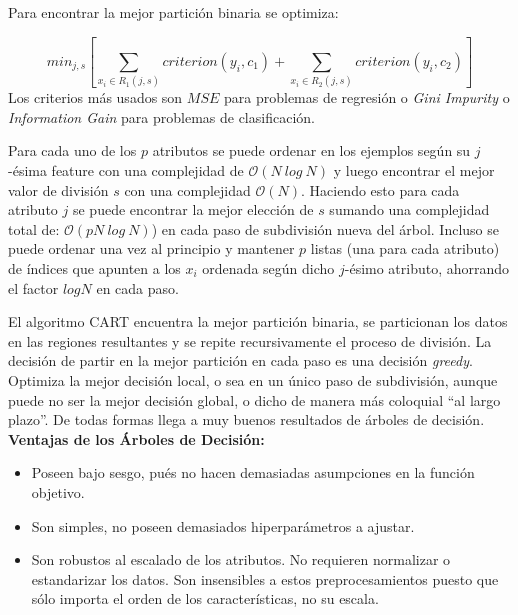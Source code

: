 Para encontrar la mejor partición binaria se optimiza:

\begin{equation*}
    min_{j,s} [ \sum_{x_i \in R_1(j,s)} criterion(y_i, c_1) + \sum_{x_i \in R_2(j,s)} criterion(y_i, c_2) ]
\end{equation*}
Los criterios más usados son $MSE$ para problemas de regresión o \textit{Gini Impurity} o \textit{Information Gain} \cite{rf-inf-gain} para problemas de clasificación.

Para cada uno de los $p$ atributos se puede ordenar en los ejemplos según su $j$-ésima feature con una complejidad de $\mathcal{O}(N~log~N)$  y luego encontrar el mejor valor de división $s$ con una complejidad $\mathcal{O}(N)$. Haciendo esto para cada atributo $j$ se puede encontrar la mejor elección de $s$ sumando una complejidad total de: $\mathcal{O}(p N~log~N)$) en cada paso de subdivisión nueva del árbol. Incluso se puede ordenar una vez al principio y mantener $p$ listas (una para cada atributo) de índices que apunten a los $x_i$ ordenada según dicho $j$-ésimo atributo, ahorrando el factor $log N$ en cada paso.

El algoritmo CART encuentra la mejor partición binaria, se particionan los datos en las regiones resultantes y se repite recursivamente el proceso de división. La decisión de partir en la mejor partición en cada paso es una decisión \textit{greedy}. Optimiza la mejor decisión local, o sea en un único paso de subdivisión, aunque puede no ser la mejor decisión global, o dicho de manera más coloquial ``al largo plazo''. De todas formas llega a muy buenos resultados de árboles de decisión. \\

\textbf{Ventajas de los Árboles de Decisión:} 
\begin{itemize}
    \item Poseen bajo sesgo, pués no hacen demasiadas asumpciones en la función objetivo.
    \item Son simples, no poseen demasiados hiperparámetros a ajustar.
    \item Son robustos al escalado de los atributos. No requieren normalizar o estandarizar los datos. Son insensibles a estos preprocesamientos puesto que sólo importa el orden de los características, no su escala.
\end{itemize}

